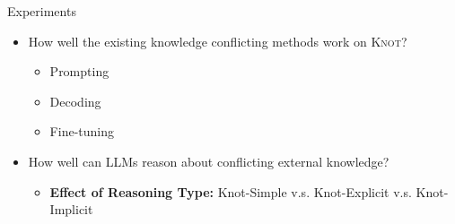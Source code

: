 \documentclass{beamer}
\newcommand{\dataname}{\textsc{Knot}\xspace}
\newcommand{\datanameE}{\textsc{Knot}-E\xspace}
\newcommand{\datanameS}{\textsc{Knot}-S\xspace}
\newcommand{\datanameI}{\textsc{Knot}-I\xspace}
\begin{document}
\begin{frame}{Experiments}
    \begin{itemize}
        \item How well the existing knowledge conflicting methods work on \dataname?
        \begin{itemize}
            \item Prompting
            \item Decoding
            \item Fine-tuning
        \end{itemize}
        \item How well can LLMs reason about conflicting external knowledge?
        \begin{itemize}
            \item \textbf{Effect of Reasoning Type:} Knot-Simple v.s. Knot-Explicit v.s. Knot-Implicit
        \end{itemize}
    \end{itemize}
\end{frame}


        
\end{document}

